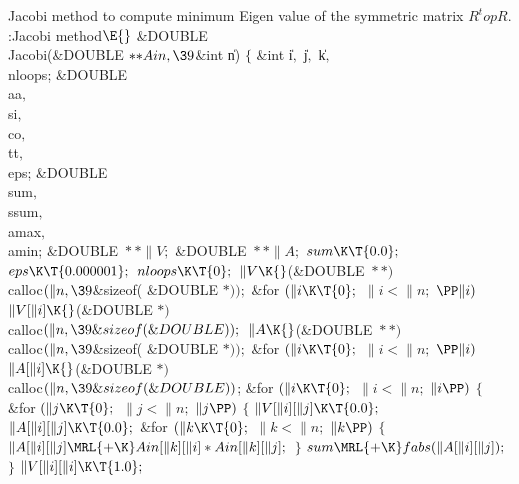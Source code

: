 Jacobi method to compute minimum Eigen value of the symmetric matrix
$R^topR$.
\Y\B\4:Jacobi method\X${}\E{}$\6
\&{DOUBLE} \\{Jacobi}(\&{DOUBLE} ${}{*}{*}\\{Ain},\39{}$\&{int} \|n)\1\1\2\2\6
${}\{{}$\1\6
\&{int} \|i${},{}$ \|j${},{}$ \|k${},{}$ \\{nloops};\6
\&{DOUBLE} \\{aa}${},{}$ \\{si}${},{}$ \\{co}${},{}$ \\{tt}${},{}$ \\{eps};\6
\&{DOUBLE} \\{sum}${},{}$ \\{ssum}${},{}$ \\{amax}${},{}$ \\{amin};\6
\&{DOUBLE} ${}{*}{*}\|V;{}$\6
\&{DOUBLE} ${}{*}{*}\|A;{}$\7
${}\\{sum}\K\T{0.0};{}$\6
${}\\{eps}\K\T{0.000001};{}$\6
${}\\{nloops}\K\T{0};{}$\6
${}\|V\K{}$(\&{DOUBLE} ${}{*}{*}){}$ \\{calloc}${}(\|n,\39{}$\&{sizeof}(%
\&{DOUBLE} ${}{*}));{}$\6
\&{for} ${}(\|i\K\T{0};{}$ ${}\|i<\|n;{}$ ${}\PP\|i){}$\1\5
${}\|V[\|i]\K{}$(\&{DOUBLE} ${}{*}){}$ \\{calloc}${}(\|n,\39\&{sizeof}(%
\&{DOUBLE}));{}$\2\6
${}\|A\K{}$(\&{DOUBLE} ${}{*}{*}){}$ \\{calloc}${}(\|n,\39{}$\&{sizeof}(%
\&{DOUBLE} ${}{*}));{}$\6
\&{for} ${}(\|i\K\T{0};{}$ ${}\|i<\|n;{}$ ${}\PP\|i){}$\1\5
${}\|A[\|i]\K{}$(\&{DOUBLE} ${}{*}){}$ \\{calloc}${}(\|n,\39\&{sizeof}(%
\&{DOUBLE})){}$;\2\6
\&{for} ${}(\|i\K\T{0};{}$ ${}\|i<\|n;{}$ ${}\|i\PP){}$\5
${}\{{}$\1\6
\&{for} ${}(\|j\K\T{0};{}$ ${}\|j<\|n;{}$ ${}\|j\PP){}$\5
${}\{{}$\1\6
${}\|V[\|i][\|j]\K\T{0.0};{}$\6
${}\|A[\|i][\|j]\K\T{0.0};{}$\6
\&{for} ${}(\|k\K\T{0};{}$ ${}\|k<\|n;{}$ ${}\|k\PP){}$\5
${}\{{}$\1\6
${}\|A[\|i][\|j]\MRL{+{\K}}\\{Ain}[\|k][\|i]*\\{Ain}[\|k][\|j];{}$\6
\4${}\}{}$\2\6
${}\\{sum}\MRL{+{\K}}\\{fabs}(\|A[\|i][\|j]);{}$\6
\4${}\}{}$\2\6
${}\|V[\|i][\|i]\K\T{1.0};{}$\6
